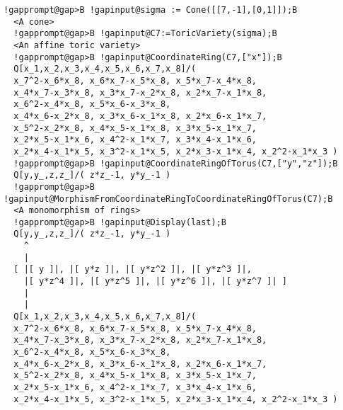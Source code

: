 \documentclass[a4paper,11pt]{report}
\begin{document}
{{{\begin{Verbatim}[commandchars=!@B,fontsize=\small,frame=single,label=Example]
  !gapprompt@gap>B !gapinput@sigma := Cone([[7,-1],[0,1]]);B
  <A cone>
  !gapprompt@gap>B !gapinput@C7:=ToricVariety(sigma);B
  <An affine toric variety>
  !gapprompt@gap>B !gapinput@CoordinateRing(C7,["x"]);B
  Q[x_1,x_2,x_3,x_4,x_5,x_6,x_7,x_8]/(
  x_7^2-x_6*x_8, x_6*x_7-x_5*x_8, x_5*x_7-x_4*x_8,
  x_4*x_7-x_3*x_8, x_3*x_7-x_2*x_8, x_2*x_7-x_1*x_8,
  x_6^2-x_4*x_8, x_5*x_6-x_3*x_8,
  x_4*x_6-x_2*x_8, x_3*x_6-x_1*x_8, x_2*x_6-x_1*x_7,
  x_5^2-x_2*x_8, x_4*x_5-x_1*x_8, x_3*x_5-x_1*x_7,
  x_2*x_5-x_1*x_6, x_4^2-x_1*x_7, x_3*x_4-x_1*x_6,
  x_2*x_4-x_1*x_5, x_3^2-x_1*x_5, x_2*x_3-x_1*x_4, x_2^2-x_1*x_3 )
  !gapprompt@gap>B !gapinput@CoordinateRingOfTorus(C7,["y","z"]);B
  Q[y,y_,z,z_]/( z*z_-1, y*y_-1 )
  !gapprompt@gap>B !gapinput@MorphismFromCoordinateRingToCoordinateRingOfTorus(C7);B
  <A monomorphism of rings>
  !gapprompt@gap>B !gapinput@Display(last);B
  Q[y,y_,z,z_]/( z*z_-1, y*y_-1 )
    ^
    |
  [ |[ y ]|, |[ y*z ]|, |[ y*z^2 ]|, |[ y*z^3 ]|, 
    |[ y*z^4 ]|, |[ y*z^5 ]|, |[ y*z^6 ]|, |[ y*z^7 ]| ]
    |
    |
  Q[x_1,x_2,x_3,x_4,x_5,x_6,x_7,x_8]/(
  x_7^2-x_6*x_8, x_6*x_7-x_5*x_8, x_5*x_7-x_4*x_8,
  x_4*x_7-x_3*x_8, x_3*x_7-x_2*x_8, x_2*x_7-x_1*x_8,
  x_6^2-x_4*x_8, x_5*x_6-x_3*x_8,
  x_4*x_6-x_2*x_8, x_3*x_6-x_1*x_8, x_2*x_6-x_1*x_7,
  x_5^2-x_2*x_8, x_4*x_5-x_1*x_8, x_3*x_5-x_1*x_7,
  x_2*x_5-x_1*x_6, x_4^2-x_1*x_7, x_3*x_4-x_1*x_6,
  x_2*x_4-x_1*x_5, x_3^2-x_1*x_5, x_2*x_3-x_1*x_4, x_2^2-x_1*x_3 )
\end{Verbatim}
}

 }

  }

   
\end{document}
